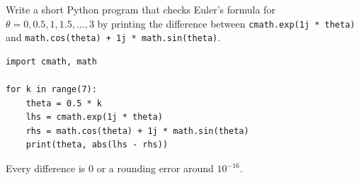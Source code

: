 \begin{Exercise}[title={Check Euler with Python}, label=eu_python]
Write a short Python program that checks Euler's formula for
$\theta = 0, 0.5, 1, 1.5, \dots, 3$ by printing the difference between
\texttt{cmath.exp(1j * theta)} and
\texttt{math.cos(theta) + 1j * math.sin(theta)}.
\end{Exercise}
\begin{Answer}[ref=eu_python]
\begin{verbatim}
import cmath, math

for k in range(7):
    theta = 0.5 * k
    lhs = cmath.exp(1j * theta)
    rhs = math.cos(theta) + 1j * math.sin(theta)
    print(theta, abs(lhs - rhs))
\end{verbatim}
Every difference is 0 or a rounding error around $10^{-16}$.
\end{Answer}
